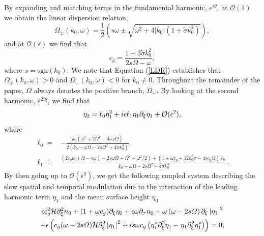 \documentclass{JFM_Style/jfm}
\begin{document}
By expanding and matching terms in the fundamental harmonic, $e^{i\theta}$, at $\mathcal{O}(1)$ we obtain the linear dispersion relation,
\begin{equation}
\Omega_{\pm}(k_{0},\omega)  = \frac{1}{2}\left(s\omega \pm \sqrt{\omega^{2} + 4|k_{0}|(1+\tilde{\sigma}k_{0}^{2})}\right),
\label{LDR}
\end{equation}
and at $\mathcal{O}(\epsilon)$ we find that
\[
c_{g} = \frac{1+3\tilde{\sigma}k_{0}^{2}}{2s\Omega - \omega},
\]
where $s=\mbox{sgn}(k_{0})$.  We note that Equation (\ref{LDR}) establishes that $\Omega_{+}(k_{0},\omega) > 0$ and $\Omega_{-}(k_{0},\omega) < 0$ for $k_{0}\neq0$.  Throughout the remainder of the paper, $\Omega$ always denotes the positive branch, $\Omega_{+}$.  By looking at the second harmonic, $e^{2i\theta}$, we find that
\[
\eta_{2} = \ell_{0}\eta_{1}^{2} + i\epsilon\ell_{1}\eta_{1}\partial_{\xi}\eta_{1}+\mathcal{O}(\epsilon^2),
\]
where
\begin{align*}
\ell_{0} = & -\frac{k_{0}\left(\omega^{2}+2\Omega^{2}-4s\omega\Omega\right)}{2(k_{0} + \omega\Omega - 2s\Omega^{2} + 4\tilde{\sigma}k_{0}^{3})},\\
\ell_{1} = & \frac{\left(2c_{g}k_{0}(\Omega-s\omega)-2s\omega\Omega + \Omega^{2} + \omega^{2}/2\right)+(1+\omega c_{g} + 12k_{0}^{2}\tilde{\sigma}-4sc_{g} \Omega)\ell_{0}}{k_{0} + \omega\Omega - 2s\Omega^{2} + 4\tilde{\sigma}k_{0}^{3}}.
\end{align*}
By then going up to $\mathcal{O}(\epsilon^{3})$, we get the following coupled system describing the slow spatial and temporal modulation due to the interaction of the leading harmonic term $\eta_{1}$ and the mean surface height $\eta_{0}$
\begin{multline}
\epsilon c_{g}^{2}\mathcal{H}\partial_{\xi}^{2}n_{0} + (1+\omega c_{g})\partial_{\xi}\eta_{0} + \epsilon \omega \partial_{\tau} n_{0} + \omega\left(\omega-2s\varOmega\right)\partial_{\xi}\left|\eta_{1}\right|^{2}\\
+\epsilon\left(c_{g}(\omega-2s\varOmega)\mathcal{H}\partial_{\xi}^{2}\left|\eta_{1}\right|^{2} + is\omega c_{g}\left(\eta_{1}^{\ast}\partial_{\xi}^{2}\eta_{1}-\eta_{1}\partial_{\xi}^{2}\eta_{1}^{\ast}\right) \right) = 0,
\label{zaveq}
\end{multline}
\end{document}

